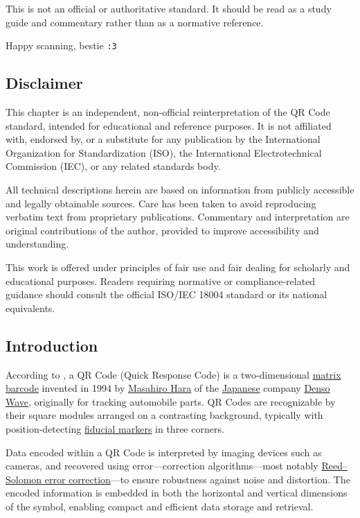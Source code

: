 \documentclass[../../2_specs]{subfiles}
\begin{document}
This is not an official or authoritative standard. It should be read as a study guide and commentary rather than as a normative reference.

Happy scanning, bestie \texttt{:3}

\subsection{Disclaimer}

This chapter is an independent, non-official reinterpretation of the QR Code standard, intended for educational and reference purposes. 
It is not affiliated with, endorsed by, or a substitute for any publication by the International Organization for Standardization (ISO), the International Electrotechnical Commission (IEC), or any related standards body.  

All technical descriptions herein are based on information from publicly accessible and legally obtainable sources.  Care has been taken to avoid reproducing verbatim text from proprietary publications.  Commentary and interpretation are original contributions of the author, provided to improve accessibility and understanding.  

This work is offered under principles of fair use and fair dealing for scholarly and educational purposes. Readers requiring normative or compliance-related guidance should consult the official ISO/IEC 18004 standard or its national equivalents.

\subsection{Introduction}

According to \textcite{wikipedia-qr}, a QR Code (Quick Response Code) is a two-dimensional \href{https://en.wikipedia.org/wiki/Barcode\#Matrix_(2D)_codes}{matrix
barcode} invented in 1994 by \href{https://en.wikipedia.org/wiki/Masahiro_Hara}{Masahiro Hara} of the \href{https://en.wikipedia.org/wiki/Japan}{Japanese} company \href{https://en.wikipedia.org/wiki/Denso\#DENSO_Wave}{Denso Wave}, originally for tracking automobile parts. 
QR Codes are recognizable by their square modules arranged on a contrasting background, typically with position-detecting \href{https://en.wikipedia.org/wiki/Fiducial_markers}{fiducial markers} in three corners.  

Data encoded within a QR Code is interpreted by imaging devices such as cameras, and recovered using error---correction algorithms—most notably \href{https://en.wikipedia.org/wiki/Reed\%E2\%80\%93Solomon_error_correction}{Reed--Solomon error correction}---to ensure robustness against noise and distortion. The encoded information is embedded in both the horizontal and vertical dimensions of the symbol, enabling compact and efficient data storage and retrieval.
\end{document}
